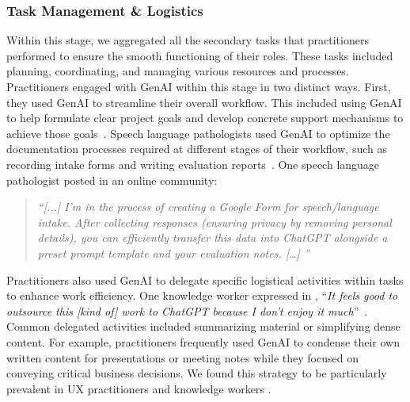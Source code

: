 
\subsubsection{Task Management \& Logistics} Within this stage, we aggregated all the secondary tasks that practitioners performed to ensure the smooth functioning of their roles. These tasks included planning, coordinating, and managing various resources and processes. Practitioners engaged with GenAI within this stage in two distinct ways. First, they used GenAI to streamline their overall workflow. This included using GenAI to help formulate clear project goals and develop concrete support mechanisms to achieve those goals~\cite{6}. %
Speech language pathologists used GenAI to optimize the documentation processes required at different stages of their workflow, such as recording intake forms and writing evaluation reports~\cite{7}. One speech language pathologist posted in an online community:

\begin{quote}
    \textit{``[...] I’m in the process of creating a Google Form for speech/language intake. After collecting responses (ensuring privacy by removing personal details), you can efficiently transfer this data into ChatGPT alongside a preset prompt template and your evaluation notes. [\dots] ''}
\end{quote}

Practitioners also used GenAI to delegate specific logistical activities within tasks to enhance work efficiency. One knowledge worker expressed in \cite{3}, ``\textit{It feels good to outsource this [kind of] work to ChatGPT because I don't enjoy it much}''~\cite{3}. Common delegated activities included summarizing material or simplifying dense content. For example, practitioners frequently used GenAI to condense their own written content for presentations or meeting notes while they focused on conveying critical business decisions. We found this strategy to be particularly prevalent in UX practitioners \cite{10} and knowledge workers \cite{3}. 


